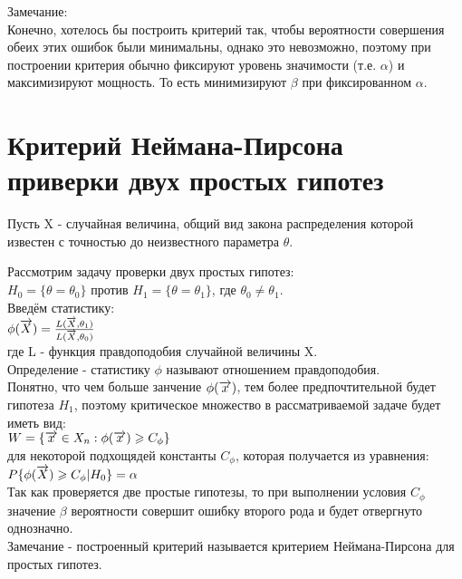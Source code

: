 Замечание:\\
Конечно, хотелось бы построить критерий так, чтобы вероятности совершения обеих этих ошибок были минимальны, однако это невозможно, поэтому при построении критерия обычно фиксируют уровень значимости (т.е. $\alpha$) и максимизируют мощность. То есть минимизируют $\beta$ при фиксированном $\alpha$.

\section{Критерий Неймана-Пирсона приверки двух простых гипотез}
Пусть X - случайная величина, общий вид закона распределения которой известен с точностью до неизвестного параметра $\theta$.

Рассмотрим задачу проверки двух простых гипотез:\\
$H_0 = \{\theta = \theta_0\}$ против $H_1 = \{\theta = \theta_1\}$, где $\theta_0 \neq \theta_1$.\\
Введём статистику:\\
$\phi(\overrightarrow{X}) = \frac{L(\overrightarrow{X}, \theta_1)}{L(\overrightarrow{X}, \theta_0)}$\\
где L - функция правдоподобия случайной величины X.\\

Определение - статистику $\phi$ называют отношением правдоподобия.\\

Понятно, что чем больше занчение $\phi(\overrightarrow{x})$, тем более предпочтительной будет гипотеза $H_1$, поэтому критическое множество в рассматриваемой задаче будет иметь вид:\\
$W = \{\overrightarrow{x} \in X_n : \phi(\overrightarrow{x}) \geqslant C_\phi\}$\\
для некоторой подхощядей константы $C_\phi$, которая получается из уравнения:\\
$P\{\phi(\overrightarrow{X}) \geqslant C_\phi | H_0\} = \alpha$\\
Так как проверяется две простые гипотезы, то при выполнении условия $C_\phi$ значение $\beta$ вероятности совершит ошибку второго рода и будет отвергнуто однозначно.\\

Замечание - построенный критерий называется критерием Неймана-Пирсона для простых гипотез.\\

